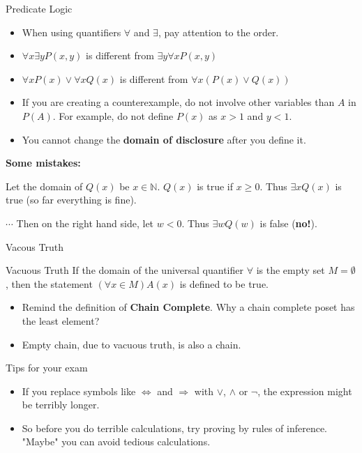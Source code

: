 \begin{frame}{Predicate Logic}
    \begin{itemize}
        \item When using quantifiers $\forall$ and $\exists$, pay attention to the order.
        \item $\forall x\exists y P(x,y)$ is different from $\exists y\forall x P(x,y)$
        \item $\forall xP(x)\vee \forall xQ(x)$ is different from $\forall x(P(x)\vee Q(x))$
        \item If you are creating a counterexample, do not involve other variables than $A$ in $P(A)$. For example, do not define $P(x)$ as $x>1$ and $y<1$.
        \item You cannot change the \textbf{domain of disclosure} after you define it.
    \end{itemize}
    \textbf{Some mistakes:}
    \begin{example}
        Let the domain of $Q(x)$ be $x\in\mathbb{N}$. $Q(x)$ is true if $x\geq 0$. Thus $\exists x Q(x)$ is true (so far everything is fine).
        
        $\cdots$ Then on the right hand side, let $w<0$. Thus $\exists w Q(w)$ is false (\textbf{no!}).
    \end{example}
\end{frame}

\begin{frame}{Vacous Truth}
    \begin{block}{Vacuous Truth}
        If the domain of the universal quantifier $\forall$ is the empty set $M=\emptyset$, then the statement $(\forall x\in M)A(x)$ is defined to be true.
    \end{block}
    \begin{itemize}
        \item Remind the definition of \textbf{Chain Complete}. Why a chain complete poset has the least element?
        \item Empty chain, due to vacuous truth, is also a chain.
    \end{itemize}
\end{frame}

\begin{frame}{Tips for your exam}
    \begin{itemize}
        \item If you replace symbols like $\Leftrightarrow$ and $\Rightarrow$ with $\vee$, $\wedge$ or $\neg$, the expression might be terribly longer.
        \item So before you do terrible calculations, try proving by rules of inference. "Maybe" you can avoid tedious calculations.
    \end{itemize}
\end{frame}

